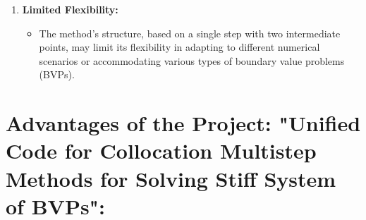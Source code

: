 \documentclass{article}
\begin{document}
\begin{enumerate}
    \item \textbf{Limited Flexibility:}
    \begin{itemize}
        \item The method's structure, based on a single step with two intermediate points, may limit its flexibility in adapting to different numerical scenarios or accommodating various types of boundary value problems (BVPs).
    \end{itemize}
\end{enumerate}

\section*{Advantages of the Project: "Unified Code for Collocation Multistep Methods for Solving Stiff System of BVPs":}
\end{document}
